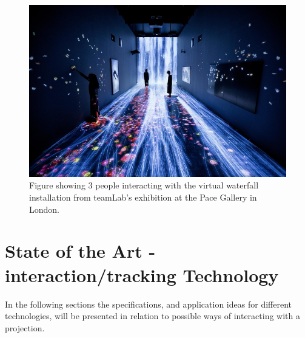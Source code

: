     \begin{figure}[H]
    	\centering
    	\includegraphics[width=0.9\linewidth]{figure/Analysis/transcendingBoundaries.jpg}
    	\caption{Figure showing 3 people interacting with the virtual waterfall installation from teamLab's exhibition at the Pace Gallery in London\cite{transcendingBoundries}.}
    	\label{fig:transcendingBoundaries}
    \end{figure}
    
\section{State of the Art - interaction/tracking Technology}
In the following sections the specifications, and application ideas for different technologies, will be presented in relation to possible ways of interacting with a projection.   
    
